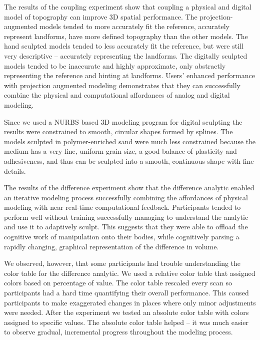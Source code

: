 \documentclass[prodmode,acmtochi]{acmsmall} %
\begin{document}
The results of the coupling experiment show that 
coupling a physical and digital model of topography 
can improve 3D spatial performance. 
%
The projection-augmented models tended
to more accurately fit the reference, 
accurately represent landforms, 
have more defined topography
than the other models. 
%
The hand sculpted models tended
to less accurately fit the reference, but
were still very descriptive 
-- accurately representing the landforms. 
%
The digitally sculpted models tended
to be inaccurate and highly approximate,
only abstractly representing the reference
and hinting at landforms. 
%
Users' enhanced performance with projection augmented modeling 
demonstrates that they can successfully 
combine the physical and computational affordances 
of analog and digital modeling. 

Since we used a NURBS based 3D modeling program 
for digital sculpting
the results were constrained to smooth, circular shapes %
formed by splines.
%
%
The models sculpted in polymer-enriched sand 
were much less constrained 
because the medium has a very fine, uniform grain size,
a good balance of plasticity and adhesiveness,
and thus can be sculpted into a smooth, continuous shape
with fine details.

The results of the difference experiment show that 
the difference analytic 
enabled an iterative modeling process
successfully combining the affordances of physical modeling
with near real-time computational feedback. 
%
Participants tended to perform well without training 
successfully managing to %
understand the analytic
and use it to adaptively sculpt.
%
This suggests that they were able to offload the cognitive work 
of manipulation onto their bodies, while cognitively 
parsing a rapidly changing, graphical representation of the difference in volume.

We observed, however, that some participants had trouble understanding
the color table for the difference analytic. 
We used a relative color table 
that assigned colors based on percentage of value.
The color table rescaled every scan 
so participants had a hard time quantifying their overall performance.
This caused participants to make exaggerated changes in places
where only minor adjustments were needed.
%
After the experiment we tested an absolute color table
with colors assigned to specific values.
The absolute color table helped -- it was much easier 
to observe gradual, incremental progress throughout the modeling process.
\end{document}
